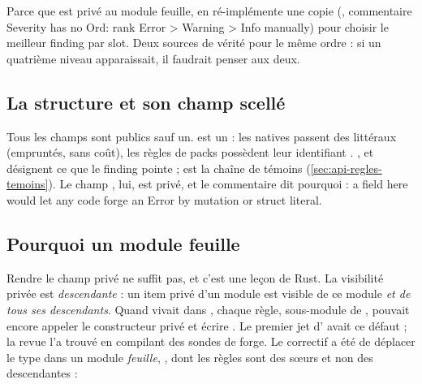 \begin{piege}
Parce que  est privé au module feuille,  en ré-implémente une copie (, commentaire \og Severity has no Ord: rank Error > Warning > Info manually\fg) pour choisir le meilleur finding par slot. Deux sources de vérité pour le même ordre : si un quatrième niveau apparaissait, il faudrait penser aux deux.
\end{piege}

\subsection{La structure et son champ scellé}


Tous les champs sont publics sauf un.  est un  : les natives passent des littéraux (empruntés, sans coût), les règles de packs possèdent leur identifiant . ,  et  désignent ce que le finding pointe ;  est la chaîne de témoins (\cref{sec:api-regles-temoins}). Le champ , lui, est privé, et le commentaire dit pourquoi : \og a  field here would let any code forge an Error by mutation or struct literal\fg.

\subsection{Pourquoi un module feuille}

Rendre le champ privé ne suffit pas, et c'est une leçon de Rust. La visibilité privée est \emph{descendante} : un item privé d'un module est visible de ce module \emph{et de tous ses descendants}. Quand  vivait dans , chaque règle, sous-module de , pouvait encore appeler le constructeur \og privé\fg{} et écrire . Le premier jet d' avait ce défaut ; la revue l'a trouvé en compilant des sondes de forge. Le correctif a été de déplacer le type dans un module \emph{feuille}, , dont les règles sont des sœurs et non des descendantes :


